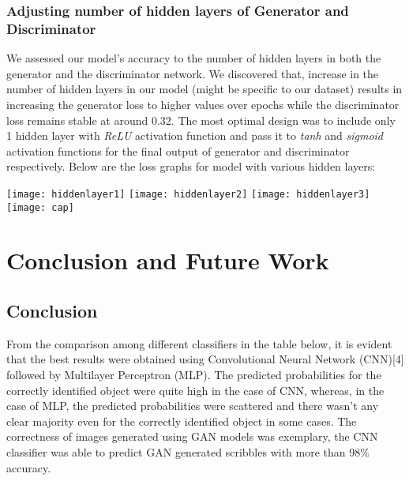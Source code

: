 \documentclass{article} %
\begin{document}
\subsubsection{Adjusting number of hidden layers of Generator and Discriminator}
\label{ganloss}
We assessed our model’s accuracy to the number of hidden layers in both the generator and the discriminator network. We discovered that, increase in the number of hidden layers in our model (might be specific to our dataset) results in increasing the generator loss to higher values over epochs while the discriminator loss remains stable at around 0.32. The most optimal design was to include only 1 hidden layer with \textit{ReLU} activation function and pass it to \textit{tanh} and \textit{sigmoid} activation functions for the final output of generator and discriminator respectively. Below are the loss graphs for model with various hidden layers:

\texttt{[image: hiddenlayer1]}
\texttt{[image: hiddenlayer2]}
\texttt{[image: hiddenlayer3]}
\texttt{[image: cap]}

%
%


\section{Conclusion and Future Work}
\smallskip
\label{conclusion}
\subsection{Conclusion}
\smallskip
From the comparison among different classifiers in the table below, it is evident that the best results were obtained using Convolutional Neural Network (CNN)[4] followed by Multilayer Perceptron (MLP). The predicted probabilities for the correctly identified object were quite high in the case of CNN, whereas, in the case of MLP, the predicted probabilities were scattered and there wasn’t any clear majority even for the correctly identified object in some cases. The correctness of images generated using GAN models was exemplary, the CNN classifier was able to predict GAN generated scribbles with more than 98\% accuracy.
\bigskip
\end{document}
